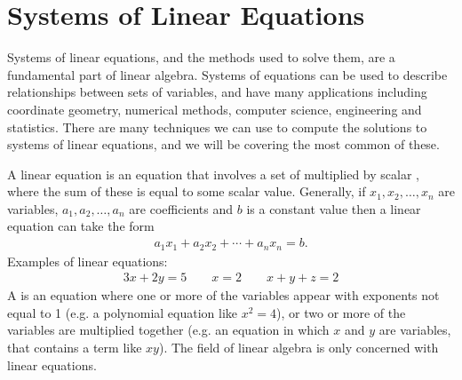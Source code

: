 \documentclass[letterpaper,10pt,english]{jupyterBook}
\begin{document}
\sphinxstepscope

\ignorespaces 

\chapter{Systems of Linear Equations}
\label{\detokenize{_pages/2.0_Linear_systems:systems-of-linear-equations}}\label{\detokenize{_pages/2.0_Linear_systems:systems-of-linear-equations-chapter}}\label{\detokenize{_pages/2.0_Linear_systems:index-0}}\label{\detokenize{_pages/2.0_Linear_systems::doc}}
\ignorespaces 
\sphinxAtStartPar
Systems of linear equations, and the methods used to solve them, are a fundamental part of linear algebra. Systems of equations can be used to describe relationships between sets of variables, and have many applications including co\sphinxhyphen{}ordinate geometry, numerical methods, computer science, engineering and statistics. There are many techniques we can use to compute the solutions to systems of linear equations, and we will be covering the most common of these.

\sphinxAtStartPar
A linear equation is an equation that involves a set of  multiplied by scalar , where the sum of these is equal to some  scalar value. Generally, if \(x_1, x_2, \ldots, x_n\) are variables, \(a_1, a_2, \ldots, a_n\) are coefficients and \(b\) is a constant value then a linear equation can take the form
\begin{equation*}
\begin{split} a_1 x_1 + a_2 x_2 + \cdots + a_n x_n = b. \end{split}
\end{equation*}
\sphinxAtStartPar
Examples of linear equations:
\begin{equation*}
\begin{split} 3x + 2y = 5 \qquad x = 2 \qquad x + y + z = 2 \end{split}
\end{equation*}
\sphinxAtStartPar
A  is an equation where one or more of the variables appear with exponents not equal to 1 (e.g. a polynomial equation like \(x^2 = 4\)), or two or more of the variables are multiplied together (e.g. an equation in which \(x\) and \(y\) are variables, that contains a term like \(xy\)). The field of linear algebra is only concerned with linear equations.
\end{document}
